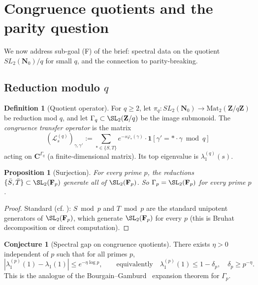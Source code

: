 ﻿\documentclass[11pt]{article}
\newtheorem{proposition}[theorem]{Proposition}
\theoremstyle{definition}
\newtheorem{definition}[theorem]{Definition}
\newtheorem{conjecture}[theorem]{Conjecture}
\newcommand{\Nz}{\mathbf{N}_0}
\newcommand{\Z}{\mathbf{Z}}
\newcommand{\C}{\mathbf{C}}
\newcommand{\F}{\mathbf{F}}
\newcommand{\SLNz}{SL_2(\Nz)}
\newcommand{\Lop}{\mathcal{L}}
\begin{document}
\section{Congruence quotients and the parity question}\label{sec:congruence}

We now address sub-goal (F) of the brief: spectral data on the quotient $\SLNz/q$ for small $q$, and the connection to parity-breaking.

\subsection{Reduction modulo $q$}

\begin{definition}[Quotient operator]\label{def:Lop-q}
For $q\ge 2$, let $\pi_q:\SLNz\to\mathrm{Mat}_2(\Z/q\Z)$ be reduction mod $q$, and let $\Gamma_q\subset\SL_2(\Z/q)$ be the image submonoid. The \emph{congruence transfer operator} is the matrix
\[
(\Lop_s^{(q)})_{\gamma,\gamma'} := \sum_{*\in\{S,T\}}e^{-s\varphi_*(\gamma)}\cdot\mathbf{1}[\gamma'=*\cdot\gamma\bmod q]
\]
acting on $\C^{\Gamma_q}$ (a finite-dimensional matrix). Its top eigenvalue is $\lambda_1^{(q)}(s)$.
\end{definition}

\begin{proposition}[Surjection]\label{prop:surjection}
For every prime $p$, the reductions $\{\bar S,\bar T\}\subset\SL_2(\F_p)$ generate all of $\SL_2(\F_p)$. So $\Gamma_p=\SL_2(\F_p)$ for every prime $p$.
\end{proposition}

\begin{proof}
Standard (cf. \cite[Lemma~2.1]{magee-oh-winter}): $S\bmod p$ and $T\bmod p$ are the standard unipotent generators of $\SL_2(\F_p)$, which generate $\SL_2(\F_p)$ for every $p$ (this is Bruhat decomposition or direct computation).
\end{proof}

\begin{conjecture}[Spectral gap on congruence quotients]\label{conj:gap}
There exists $\eta>0$ independent of $p$ such that for all primes $p$,
\[
|\lambda_1^{(p)}(1) - \lambda_1(1)| \le e^{-\eta\log p},\qquad\text{equivalently}\quad \lambda_1^{(p)}(1)\le 1-\delta_p,\quad \delta_p\ge p^{-\eta}.
\]
This is the analogue of the Bourgain--Gamburd~\cite{bourgain-gamburd} expansion theorem for $\Gamma_p$.
\end{conjecture}
\end{document}
